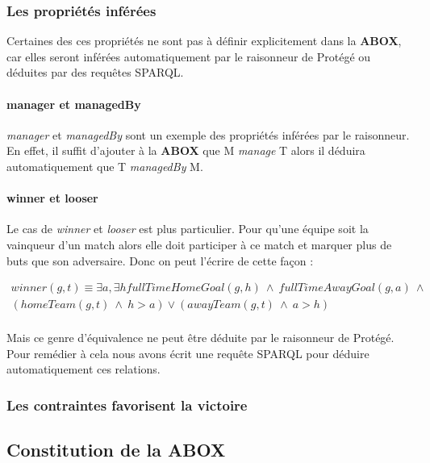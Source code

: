 \documentclass[oneside,13pt,a4paper]{article}
\begin{document}
\subsubsection{Les propriétés inférées}

Certaines des ces propriétés ne sont pas à définir explicitement dans la \textbf{ABOX}, car elles seront inférées automatiquement par le raisonneur de Protégé ou déduites par des requêtes SPARQL.

\paragraph{manager et managedBy}

\textit{manager} et \textit{managedBy} sont un exemple des propriétés inférées par le raisonneur. En effet, il suffit d'ajouter à la \textbf{ABOX} que M \textit{manage} T alors il déduira automatiquement que T \textit{managedBy} M.

\paragraph{winner et looser}

Le cas de \textit{winner} et \textit{looser} est plus particulier. Pour qu’une équipe soit la vainqueur d’un match alors elle doit participer à ce match et marquer plus de buts que son adversaire. Donc on peut l’écrire de cette façon :

\begin{multline*}
winner(g,t) \equiv \exists a,\exists h  fullTimeHomeGoal(g,h) \ \wedge \ fullTimeAwayGoal(g, a) \ \wedge \ \\
  (homeTeam(g,t) \ \wedge \ h > a)  \vee (awayTeam(g,t) \ \wedge \  a > h) \\
\end{multline*}

Mais ce genre d'équivalence ne peut être déduite par le raisonneur de Protégé. Pour remédier à cela nous avons écrit une requête SPARQL pour déduire automatiquement ces relations.



\subsubsection{Les contraintes favorisent la victoire}

\subsection{Constitution de la ABOX}
\end{document}
